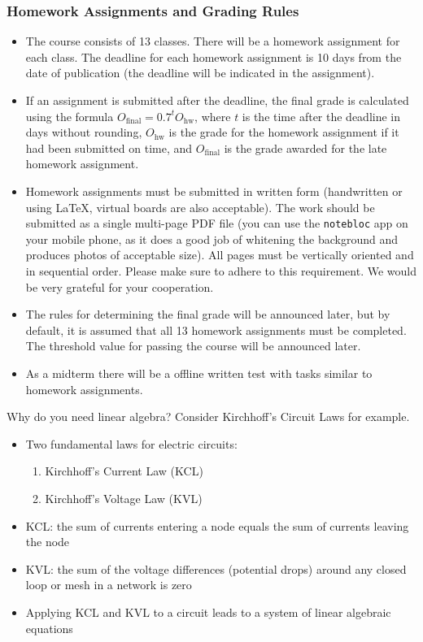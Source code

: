 \documentclass[fullscreen=true, bookmarks=true, hyperref={pdfencoding=unicode}]{beamer}
\begin{document}
\begin{frame}[t]
  \frametitle{Homework Assignments and Grading Rules}

  {\scriptsize
  \begin{itemize}
    \item The course consists of 13 classes. There will be a homework assignment 
  for each class. The deadline for each homework assignment is 10 days 
  from the date of publication (the deadline will be indicated 
  in the assignment). 
  \item If an assignment is submitted after the deadline, 
  the final grade is calculated using the 
  formula $O_{\text{final}} = 0.7^t O_{\text{hw}}$, 
  where $t$ is the time after the deadline in days without rounding, 
  $O_{\text{hw}}$ is the grade for the homework assignment 
  if it had been submitted on time, and 
  $O_{\text{final}}$ is the grade awarded for the late homework assignment.
  
  \item Homework assignments must be submitted in written form 
  (handwritten or using \LaTeX, virtual boards are also acceptable). 
  The work should be submitted as a single multi-page PDF file 
  (you can use the \texttt{notebloc} app on your mobile phone, as it does 
  a good job of whitening the background and produces photos 
  of acceptable size). 
  All pages must be vertically oriented and in sequential order. 
  Please make sure to adhere to this requirement. We would be very grateful for your cooperation.
  
  \item The rules for determining the final grade will be announced later, 
  but by default, it is assumed that all 13 homework assignments 
  must be completed. The threshold value for passing the course 
  will be announced later.

  \item As a midterm there will be a offline written test with tasks 
  similar to homework assignments.
  \end{itemize}
  }
\end{frame}


\begin{frame}{Why do you need linear algebra?}
  Consider Kirchhoff's Circuit Laws for example.
  \begin{itemize}
  \item Two fundamental laws for electric circuits:
    \begin{enumerate}
      \item Kirchhoff's Current Law (KCL)
      \item Kirchhoff's Voltage Law (KVL)
    \end{enumerate}
  \pause\item KCL: the sum of currents entering a node equals the sum of currents leaving the node
  \pause\item KVL: the sum of the voltage differences (potential drops) around any closed loop or mesh in a network is zero
  \pause\item Applying KCL and KVL to a circuit leads to a system of linear algebraic equations
  \end{itemize}  
\end{frame}  
\end{document}
